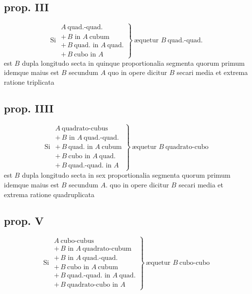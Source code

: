 \documentclass[11pt,a4paper]{article}
\begin{document}
\subsection*{prop. III}

\[ \text{Si } \left.\begin{array}{l} A\ \text{quad.-quad.} \\ +\,B \text{ in } A\ \text{cubum} \\ +\,B\ \text{quad. in } A\ \text{quad.} \\ +\,B\ \text{cubo in } A \end{array}\right\}\ \text{æquetur } B\ \text{quad.-quad.} \]
est $B$ dupla longitudo secta in quinque  proportionalia segmenta quorum primum idemque maius est $B$ secundum $A$ quo in opere dicitur $B$ secari media et extrema ratione triplicata

\subsection*{prop. IIII}

\[ \text{Si } \left.\begin{array}{l} A\ \text{quadrato-cubus} \\ +\,B \text{ in } A\ \text{quad.-quad.} \\ +\,B\ \text{quad. in } A\ \text{cubum} \\ +\,B\ \text{cubo in } A\ \text{quad.} \\ +\,B\ \text{quad.-quad. in } A \end{array}\right\}\ \text{æquetur } B\ \text{quadrato-cubo} \]
est $B$ dupla longitudo secta in sex proportionalia segmenta quorum primum idemque maius est $B$ secundum $A$. quo in opere dicitur $B$ secari media et extrema ratione quadruplicata

\subsection*{prop. V}

\[ \text{Si } \left.\begin{array}{l} A\ \text{cubo-cubus} \\ +\,B \text{ in } A\ \text{quadrato-cubum} \\ +\,B \text{ in } A\ \text{quad.-quad.} \\ +\,B\ \text{cubo in } A\ \text{cubum} \\ +\,B\ \text{quad.-quad. in } A\ \text{quad.} \\ +\,B\ \text{quadrato-cubo in } A \end{array}\right\}\ \text{æquetur } B\ \text{cubo-cubo} \]
\end{document}
